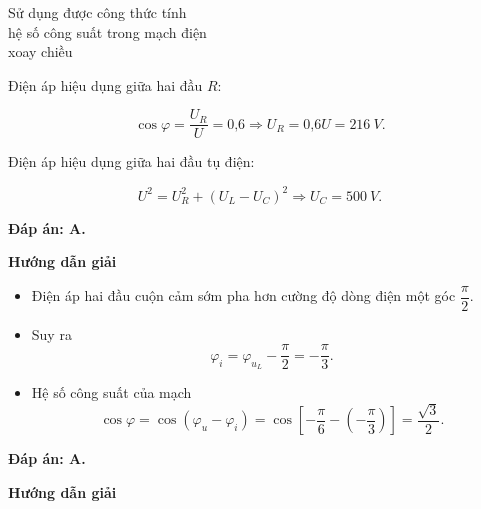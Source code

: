 \begin{dang}{Sử dụng được công thức tính \\ hệ số công suất trong mạch điện \\ xoay chiều}
{		Điện áp hiệu dụng giữa hai đầu $R$:
		
		$$\cos \varphi = \dfrac{U_R}{U} = \text{0,6} \Rightarrow U_R =\text{0,6}U = \SI{216}{V}.$$
		
		Điện áp hiệu dụng giữa hai đầu tụ điện:
		
		$$U^2 = U^2_R + (U_L - U_C)^2 \Rightarrow U_C =\SI{500}{V}.$$
		
		
		\textbf{Đáp án: A.}
	}
	
	{\begin{center}
			\textbf{Hướng dẫn giải}
		\end{center}
		
		\begin{itemize}
			\item Điện áp hai đầu cuộn cảm sớm pha hơn cường độ dòng điện một góc $\dfrac{\pi}{2}$.
			\item Suy ra
			\begin{equation*}
				\varphi_i=\varphi_{u_L} - \dfrac{\pi}{2}= -\dfrac{\pi}{3}.
			\end{equation*}
			\item Hệ số công suất của mạch 
			\begin{equation*}
				\cos \varphi = \cos \left(\varphi_u-\varphi_i\right) = \cos \left[-\dfrac{\pi}{6} - \left(-\dfrac{\pi}{3}\right)\right]= \dfrac{\sqrt 3}{2}.
			\end{equation*}
		\end{itemize}	
		
		
		\textbf{Đáp án: A.}
	}
	{\begin{center}
			\textbf{Hướng dẫn giải}
		\end{center}
		
}
\end{dang}

